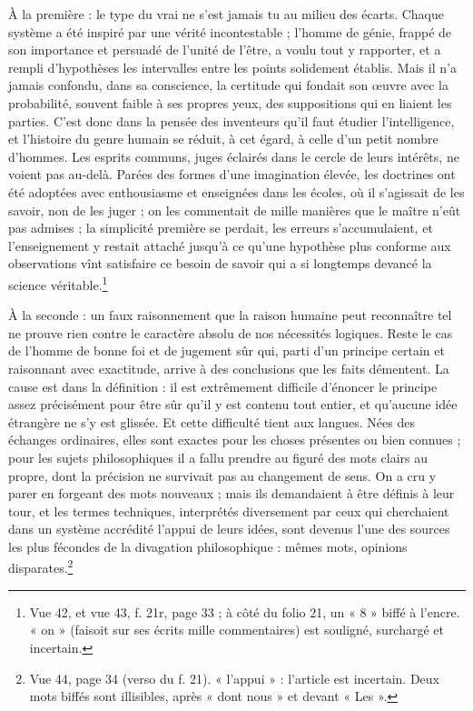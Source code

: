 \documentclass[11pt,a4paper]{article}
\begin{document}
À la première : le type du vrai ne s'est jamais tu au milieu des écarts. Chaque
système a été inspiré par une vérité incontestable ; l'homme de génie, frappé
de son importance et persuadé de l'unité de l'être, a voulu tout y rapporter,
et a rempli d'hypothèses les intervalles entre les points solidement établis.
Mais il n'a jamais confondu, dans sa conscience, la certitude qui fondait son
œuvre avec la probabilité, souvent faible à ses propres yeux, des suppositions
qui en liaient les parties. C'est donc dans la pensée des inventeurs qu'il faut
étudier l'intelligence, et l'histoire du genre humain se réduit, à cet égard, à
celle d'un petit nombre d'hommes. Les esprits communs, juges éclairés dans le
cercle de leurs intérêts, ne voient pas au-delà. Parées des formes d'une
imagination élevée, les doctrines ont été adoptées avec enthousiasme et
enseignées dans les écoles, où il s'agissait de les savoir, non de les juger ;
on les commentait de mille manières que le maître n'eût pas admises ; la
simplicité première se perdait, les erreurs s'accumulaient, et l'enseignement y
restait attaché jusqu'à ce qu'une hypothèse plus conforme aux observations
vînt satisfaire ce besoin de savoir qui a si longtemps devancé la science
véritable.\footnote{Vue 42, et vue 43, f. 21r, page 33 ; à côté du folio 21, un
« 8 » biffé à l'encre. « on » (faisoit sur ses écrits mille commentaires) est
souligné, surchargé et incertain.}

À la seconde : un faux raisonnement que la raison humaine peut reconnaître tel
ne prouve rien contre le caractère absolu de nos nécessités logiques. Reste le
cas de l'homme de bonne foi et de jugement sûr qui, parti d'un principe certain
et raisonnant avec exactitude, arrive à des conclusions que les faits démentent.
La cause est dans la définition : il est extrêmement difficile d'énoncer le
principe assez précisément pour être sûr qu'il y est contenu tout entier, et
qu'aucune idée étrangère ne s'y est glissée. Et cette difficulté tient aux
langues. Nées des échanges ordinaires, elles sont exactes pour les choses
présentes ou bien connues ; pour les sujets philosophiques il a fallu prendre au
figuré des mots clairs au propre, dont la précision ne survivait pas au
changement de sens. On a cru y parer en forgeant des mots nouveaux ; mais ils
demandaient à être définis à leur tour, et les termes techniques, interprétés
diversement par ceux qui cherchaient dans un système accrédité l'appui de leurs
idées, sont devenus l'une des sources les plus fécondes de la divagation
philosophique : mêmes mots, opinions disparates.\footnote{Vue 44, page 34
(verso du f. 21). « l'appui » : l'article est incertain. Deux mots biffés sont
illisibles, après « dont nous » et devant « Les ».}
\end{document}
